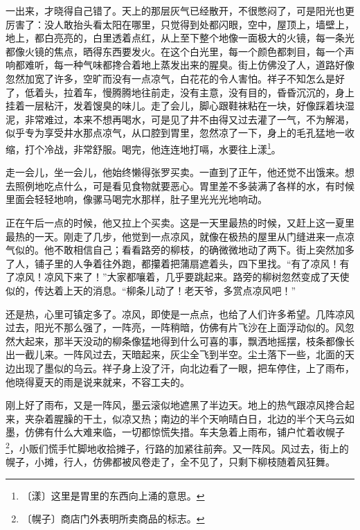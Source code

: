 \documentclass[12pt,UTF-8,openany]{ctexbook}
\begin{document}
\begin{normalsize}
    一出来，才晓得自己错了。天上的那层灰气已经散开，不很憋闷了，可是阳光也更厉害了：没人敢抬头看太阳在哪里，只觉得到处都闪眼，空中，屋顶上，墙壁上，地上，都白亮亮的，白里透着点红，从上至下整个地像一面极大的火镜，每一条光都像火镜的焦点，晒得东西要发火。在这个白光里，每一个颜色都刺目，每一个声响都难听，每一种气味都搀合着地上蒸发出来的腥臭。街上仿佛没了人，道路好像忽然加宽了许多，空旷而没有一点凉气，白花花的令人害怕。祥子不知怎么是好了，低着头，拉着车，慢腾腾地往前走，没有主意，没有目的，昏昏沉沉的，身上挂着一层粘汗，发着馊臭的味儿。走了会儿，脚心跟鞋袜粘在一块，好像踩着块湿泥，非常难过，本来不想再喝水，可是见了井不由得又过去灌了一气，不为解渴，似乎专为享受井水那点凉气，从口腔到胃里，忽然凉了一下，身上的毛孔猛地一收缩，打个冷战，非常舒服。喝完，他连连地打嗝，水要往上漾\footnote{〔漾〕这里是胃里的东西向上涌的意思。}。
    
    走一会儿，坐一会儿，他始终懒得张罗买卖。一直到了正午，他还觉不出饿来。想去照例地吃点什么，可是看见食物就要恶心。胃里差不多装满了各样的水，有时候里面会轻轻地响，像骡马喝完水那样，肚子里光光光地响动。
    
    正在午后一点的时候，他又拉上个买卖。这是一天里最热的时候，又赶上这一夏里最热的一天。刚走了几步，他觉到一点凉风，就像在极热的屋里从门缝进来一点凉气似的。他不敢相信自己；看看路旁的柳枝，的确微微地动了两下。街上突然加多了人，铺子里的人争着往外跑，都攥着把蒲扇遮着头，四下里找。“有了凉风！有了凉风！凉风下来了！”大家都嚷着，几乎要跳起来。路旁的柳树忽然变成了天使似的，传达着上天的消息。“柳条儿动了！老天爷，多赏点凉风吧！”
    
    还是热，心里可镇定多了。凉风，即使是一点点，也给了人们许多希望。几阵凉风过去，阳光不那么强了，一阵亮，一阵稍暗，仿佛有片飞沙在上面浮动似的。风忽然大起来，那半天没动的柳条像猛地得到什么可喜的事，飘洒地摇摆，枝条都像长出一截儿来。一阵风过去，天暗起来，灰尘全飞到半空。尘土落下一些，北面的天边出现了墨似的乌云。祥子身上没了汗，向北边看了一眼，把车停住，上了雨布，他晓得夏天的雨是说来就来，不容工夫的。
    
    刚上好了雨布，又是一阵风，墨云滚似地遮黑了半边天。地上的热气跟凉风搀合起来，夹杂着腥臊的干土，似凉又热；南边的半个天响晴白日，北边的半个天乌云如墨，仿佛有什么大难来临，一切都惊慌失措。车夫急着上雨布，铺户忙着收幌子\footnote{〔幌子〕商店门外表明所卖商品的标志。}，小贩们慌手忙脚地收拾摊子，行路的加紧往前奔。又一阵风。风过去，街上的幌子，小摊，行人，仿佛都被风卷走了，全不见了，只剩下柳枝随着风狂舞。
    

\end{normalsize}
\end{document}
